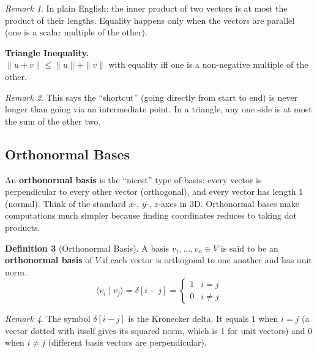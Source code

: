 \documentclass[11pt]{article}
\theoremstyle{definition}
\newtheorem{definition}{Definition}[section]
\theoremstyle{plain}
\theoremstyle{remark}
\newtheorem{remark}[definition]{Remark}
\begin{document}
\begin{remark}
In plain English: the inner product of two vectors is at most the product of their lengths. Equality happens only when the vectors are parallel (one is a scalar multiple of the other).
\end{remark}

\begin{resultbox}
\textbf{Triangle Inequality.} \\
$\|u + v\| \leq \|u\| + \|v\|$ with equality iff one is a non-negative multiple of the other.
\end{resultbox}

\begin{remark}
This says the ``shortcut'' (going directly from start to end) is never longer than going via an intermediate point. In a triangle, any one side is at most the sum of the other two.
\end{remark}

\subsection{Orthonormal Bases}

\begin{intuitionbox}
An \textbf{orthonormal basis} is the ``nicest'' type of basis: every vector is perpendicular to every other vector (orthogonal), and every vector has length 1 (normal). Think of the standard $x$-, $y$-, $z$-axes in 3D. Orthonormal bases make computations much simpler because finding coordinates reduces to taking dot products.
\end{intuitionbox}

\begin{definition}[Orthonormal Basis]
A basis $v_1, \ldots, v_n \in V$ is said to be an \textbf{orthonormal basis} of $V$ if each vector is orthogonal to one another and has unit norm.
\[
\langle v_i \mid v_j \rangle = \delta[i - j] = \begin{cases} 1 & i = j \\ 0 & i \neq j \end{cases}
\]
\end{definition}

\begin{remark}
The symbol $\delta[i-j]$ is the Kronecker delta. It equals 1 when $i = j$ (a vector dotted with itself gives its squared norm, which is 1 for unit vectors) and 0 when $i \neq j$ (different basis vectors are perpendicular).
\end{remark}
\end{document}
